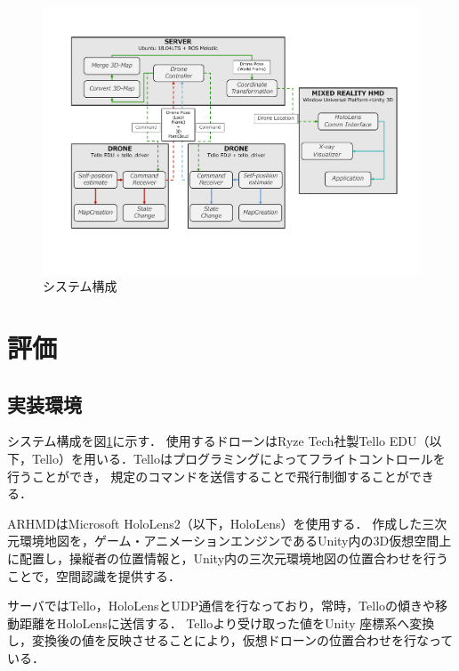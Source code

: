 \documentclass[a4paper,10pt,twocolumn,uplatex]{jsarticle}
\begin{document}

\begin{figure}[!tb]
  \centering
  \includegraphics[width=\linewidth]{img/system.pdf}
  \caption{システム構成}
  \label{fig:system}
\end{figure}
  

\section{評価}

\subsection{実装環境}
システム構成を図\ref{fig:system}に示す．
使用するドローンはRyze Tech社製Tello EDU（以下，Tello）を用いる．Telloはプログラミングによってフライトコントロールを行うことができ，
規定のコマンドを送信することで飛行制御することができる．
\par
ARHMDはMicrosoft HoloLens2（以下，HoloLens）を使用する．
作成した三次元環境地図を，ゲーム・アニメーションエンジンであるUnity内の3D仮想空間上に配置し，操縦者の位置情報と，Unity内の三次元環境地図の位置合わせを行うことで，空間認識を提供する．
\par
サーバではTello，HoloLensとUDP通信を行なっており，常時，Telloの傾きや移動距離をHoloLensに送信する．
Telloより受け取った値をUnity 座標系へ変換し，変換後の値を反映させることにより，仮想ドローンの位置合わせを行なっている．
\end{document}
